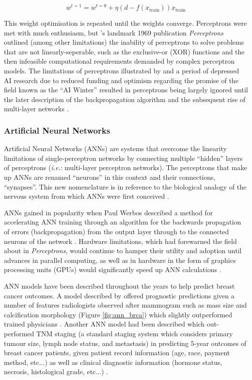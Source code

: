 $$w^{t=1} = w^{t=0} + \eta\left(d-f\left(x_{\textrm{train}}\right)\right)x_{\textrm{train}}$$

This weight optimisation is repeated until the weights converge. Perceptrons were met with much enthusiasm, but \citeauthor{minsky1969}'s landmark 1969 publication \textit{Perceptrons} outlined (among other limitations) the inability of perceptrons to solve problems that are not linearly-seperable, such as the exclusive-or (XOR) functions and the then infeasible computational requirements demanded by complex perceptron models. The limitations of perceptrons illustrated by \citeauthor{minsky1969} and a period of depressed AI research due to reduced funding and optimism regarding the promise of the field known as the ``AI Winter'' resulted in perceptrons being largely ignored until the later description of the backpropagation algorithm and the subsequent rise of multi-layer networks \citep{hendler2008}.

\subsubsection{Artificial Neural Networks}

Artificial Neural Networks (ANNs) are systems that overcome the linearity limitations of single-perceptron networks by connecting multiple ``hidden'' layers of perceptrons (\textit{i.e.}: multi-layer perceptron networks). The perceptrons that make up ANNs are renamed ``neurons'' in this context and their connections, ``synapses''. This new nomenclature is in reference to the biological analogy of the nervous system from which ANNs were first conceived \citep{kleene1956}.

ANNs gained in popularity when Paul Werbos described a method for accelerating ANN training through an algorithm for the backwards propagation of errors (backpropagation) from the output layer through to the connected neurons of the network \citep{werbos1982}. Hardware limitations, which \citeauthor{minsky1969} had forewarned the field about in \textit{Perceptrons}, would continue to hamper their utility and adoption until advances in parallel computing, as well as in hardware in the form of graphics processing units (GPUs) would significantly speed up ANN calculations \citep{simard2005, zhongwen2005}.

ANN models have been described throughout the years to help predict breast cancer outcomes. A model described by \citeauthor{floyd1994} offered prognostic predictions given a number of features radiologists observed after mammogram such as mass size and calcification morphology (Figure \ref{fig:ann_brca}) which slightly outperformed trained physicians \citep{floyd1994}. Another ANN model had been described which out-performed TNM staging (a standard staging system which considers primary tumour size, lymph node status, and metastasis) in predicting 5-year outcomes of breast cancer patients, given patient record information (age, race, payment method, etc...) as well as clinical diagnostic information (hormone status, necrosis, histological grade, etc...) \citep{burke1997}.


